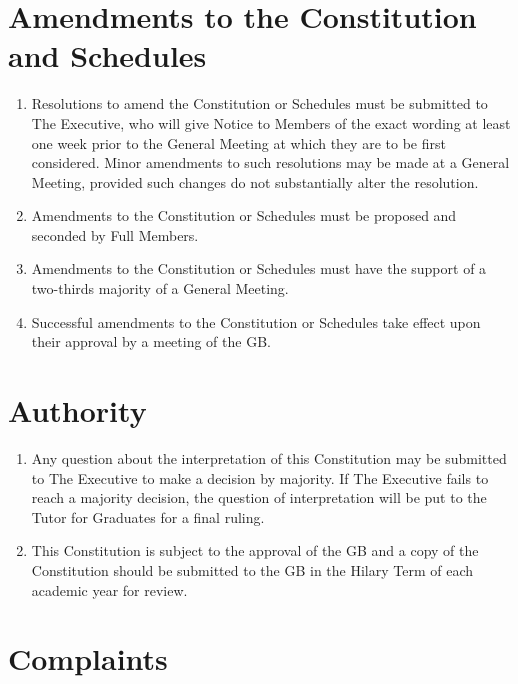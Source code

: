 \documentclass[11pt, a4paper]{article}
\begin{document}
\section{Amendments to the Constitution and Schedules}
\label{sec:amendment}

\begin{enumerate}
    \item Resolutions to amend the Constitution or Schedules must be submitted to The Executive, who will give Notice to Members of the exact wording at least one week prior to the General Meeting at which they are to be first considered. Minor amendments to such resolutions may be made at a General Meeting, provided such changes do not substantially alter the resolution.
    \item Amendments to the Constitution or Schedules must be proposed and seconded by Full Members.
    \item Amendments to the Constitution or Schedules must have the support of a two-thirds majority of a General Meeting.
    \item Successful amendments to the Constitution or Schedules take effect upon their approval by a meeting of the GB.
\end{enumerate}





\section{Authority}
\label{sec:authority}

\begin{enumerate}
    \item Any question about the interpretation of this Constitution may be submitted to The Executive to make a decision by majority. If The Executive fails to reach a majority decision, the question of interpretation will be put to the Tutor for Graduates for a final ruling.
    \item This Constitution is subject to the approval of the GB and a copy of the Constitution should be submitted to the GB in the Hilary Term of each academic year for review.
\end{enumerate}





\section{Complaints}
\label{sec:complaints}
\end{document}
